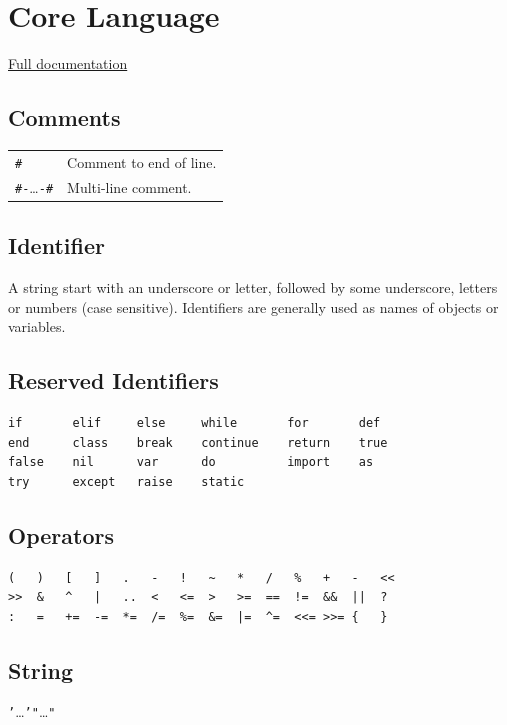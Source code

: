\section*{Core Language}

\hangpar \href{https://berry.readthedocs.io/en/latest/source/en/Reference.html}{Full documentation}

\subsection*{Comments}
\begin{tabular}{@{}ll}
\texttt{\#} & Comment to end of line. \\
\texttt{\#-}\dots\texttt{-\#} & Multi-line comment.
\end{tabular}

\subsection*{Identifier}
A string start with an underscore or letter, followed by some underscore, letters or numbers (case sensitive). Identifiers are generally used as names of objects or variables.

\subsection*{Reserved Identifiers}
\begin{lstlisting}[numbers=none]
if       elif     else     while       for       def
end      class    break    continue    return    true
false    nil      var      do          import    as
try      except   raise    static
\end{lstlisting}

\subsection*{Operators}
\begin{lstlisting}[numbers=none]
(   )   [   ]   .   -   !   ~   *   /   %   +   -   <<  
>>  &   ^   |   ..  <   <=  >   >=  ==  !=  &&  ||  ?
:   =   +=  -=  *=  /=  %=  &=  |=  ^=  <<= >>= {   }
\end{lstlisting}

\subsection*{String}
\texttt{'}\dots\texttt{'}\quad\texttt{"}\dots\texttt{"}

